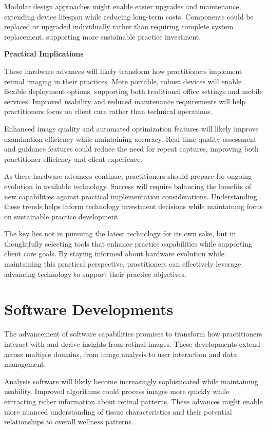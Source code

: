 \documentclass[
  Letterpaper,
]{scrbook}
\begin{document}
Modular design approaches might enable easier upgrades and maintenance,
extending device lifespan while reducing long-term costs. Components
could be replaced or upgraded individually rather than requiring
complete system replacement, supporting more sustainable practice
investment.

\textbf{Practical Implications}

These hardware advances will likely transform how practitioners
implement retinal imaging in their practices. More portable, robust
devices will enable flexible deployment options, supporting both
traditional office settings and mobile services. Improved usability and
reduced maintenance requirements will help practitioners focus on client
care rather than technical operations.

Enhanced image quality and automated optimization features will likely
improve examination efficiency while maintaining accuracy. Real-time
quality assessment and guidance features could reduce the need for
repeat captures, improving both practitioner efficiency and client
experience.

As these hardware advances continue, practitioners should prepare for
ongoing evolution in available technology. Success will require
balancing the benefits of new capabilities against practical
implementation considerations. Understanding these trends helps inform
technology investment decisions while maintaining focus on sustainable
practice development.

The key lies not in pursuing the latest technology for its own sake, but
in thoughtfully selecting tools that enhance practice capabilities while
supporting client care goals. By staying informed about hardware
evolution while maintaining this practical perspective, practitioners
can effectively leverage advancing technology to support their practice
objectives.

\section{Software Developments}\label{software-developments}

The advancement of software capabilities promises to transform how
practitioners interact with and derive insights from retinal images.
These developments extend across multiple domains, from image analysis
to user interaction and data management.

Analysis software will likely become increasingly sophisticated while
maintaining usability. Improved algorithms could process images more
quickly while extracting richer information about retinal patterns.
These advances might enable more nuanced understanding of tissue
characteristics and their potential relationships to overall wellness
patterns.
\end{document}
